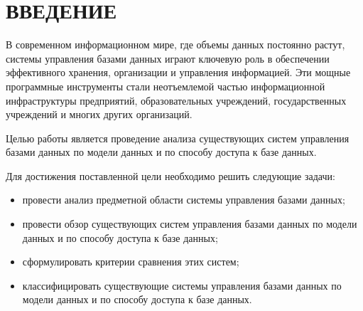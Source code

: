 \section*{\centering ВВЕДЕНИЕ}

В современном информационном мире, где объемы данных постоянно растут, системы управления базами данных играют ключевую роль в обеспечении эффективного хранения, организации и управления информацией.
Эти мощные программные инструменты стали неотъемлемой частью информационной инфраструктуры предприятий, образовательных учреждений, государственных учреждений и многих других организаций.

Целью работы является проведение анализа существующих систем управления базами данных по модели данных и по способу доступа к базе данных.

Для достижения поставленной цели необходимо решить следующие задачи:
\begin{itemize}[label=---]
	\item провести анализ предметной области системы управления базами данных;
	\item провести обзор существующих систем управления базами данных по модели данных и по способу доступа к базе данных;
	\item сформулировать критерии сравнения этих систем;
	\item классифицировать существующие системы управления базами данных по модели данных и по способу доступа к базе данных.
\end{itemize}